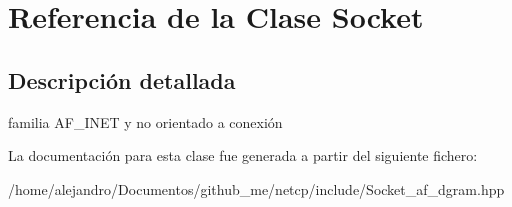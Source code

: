 \hypertarget{classSocket}{}\section{Referencia de la Clase Socket}
\label{classSocket}


\subsection{Descripción detallada}
familia A\+F\+\_\+\+I\+N\+ET y no orientado a conexión 

La documentación para esta clase fue generada a partir del siguiente fichero\+:\begin{DoxyCompactItemize}
\item 
/home/alejandro/\+Documentos/github\+\_\+me/netcp/include/Socket\+\_\+af\+\_\+dgram.\+hpp\end{DoxyCompactItemize}
